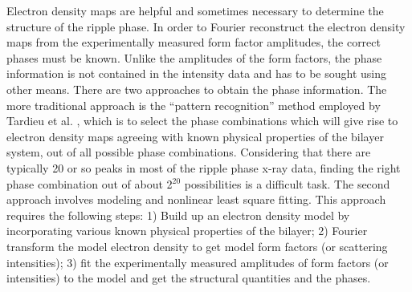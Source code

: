 

Electron density maps are helpful and sometimes necessary to determine the 
structure of the ripple phase. In order to Fourier reconstruct the electron 
density maps from the experimentally measured form factor amplitudes, the
correct phases must be known. Unlike the amplitudes of the form factors,
the phase information is not contained in the intensity data and has to be 
sought using other means. There are two approaches to obtain the phase 
information. The more traditional approach is the ``pattern recognition''
method employed by Tardieu et al. \cite{Tar73}, which is to 
select the phase combinations which will give rise to electron density maps 
agreeing with known physical properties of the bilayer system, out of all 
possible phase combinations. Considering that there are typically 20 or so 
peaks in most of the ripple phase x-ray data, finding the right phase 
combination out of about 2$^{20}$ possibilities is a difficult task. 
The second approach involves modeling and nonlinear least square fitting.
This approach requires the following steps: 1) Build up an electron density 
model by incorporating various known physical properties 
of the bilayer; 2) Fourier transform the model electron density to get model 
form factors (or scattering intensities); 3) fit the experimentally measured
amplitudes of form factors (or intensities) to the model and get the structural
quantities and the phases. 


